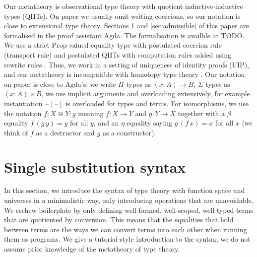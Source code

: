 \documentclass[a4paper,UKenglish,cleveref, autoref, thm-restate]{lipics-v2021}
\newcommand{\ra}{\rightarrow}
\newcommand{\blank}{\mathord{\hspace{1pt}\text{--}\hspace{1pt}}} %
\begin{document}
Our metatheory is observational type theory
\cite{DBLP:phd/hal/Pujet22} with quotient inductive-inductive types
(QIITs). On paper we usually omit writing coercions, so our notation
is close to extensional type theory. Sections \ref{sec:tt} and
\ref{sec:admissible} of this paper are formalised in the proof
assistant Agda. The formalisation is availble at TODO. We use a strict
Prop-valued \cite{DBLP:journals/pacmpl/GilbertCST19} equality type
with postulated coercion rule (transport rule) and postulated QIITs
with computation rules added using rewrite rules
\cite{DBLP:journals/pacmpl/CockxTW21}. Thus, we work in a setting of
uniqueness of identity proofs (UIP), and our metatheory is
incompatible with homotopy type theory \cite{HoTTbook}. Our notation
on paper is close to Agda's: we write $\Pi$ types as $(x:A)\ra B$,
$\Sigma$ types as $(x:A)\times B$, we use implicit arguments and
overloading extensively, for example instantiation $\blank[\blank]$ is
overloaded for types and terms. For isomorphisms, we use the notation
$f:X\cong Y:g$ meaning $f:X\ra Y$ and $g :Y\ra X$ together with a
$\beta$ equality $f\,(g\,y) = y$ for all $y$, and an $\eta$ equality
saying $g\,(f\,x) = x$ for all $x$ (we think of $f$ as a destructor
and $g$ as a constructor).

\section{Single substitution syntax}
\label{sec:tt}

In this section, we introduce the syntax of type theory with function
space and universes in a minimalistic way, only introducing operations
that are unavoidable. We eschew boilerplate by only defining
well-formed, well-scoped, well-typed terms that are quotiented by
conversion. This means that the equalities that hold between terms are
the ways we can convert terms into each other when running them as
programs. We give a tutorial-style introduction to the syntax, we do
not assume prior knowledge of the metatheory of type theory.
\end{document}
